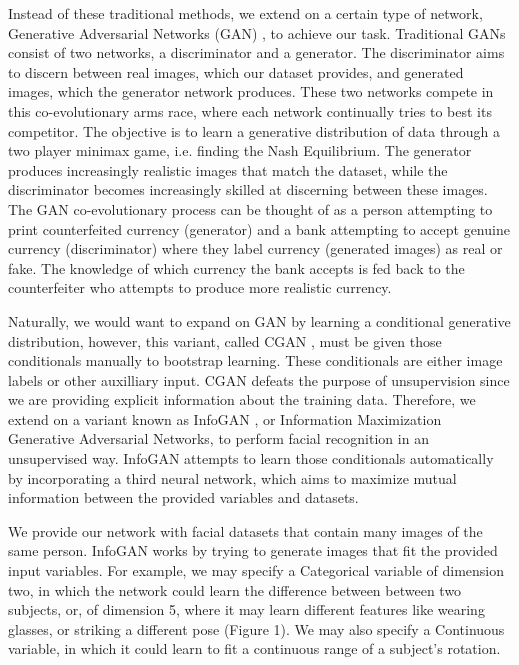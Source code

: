 \documentclass[conference,11pt]{IEEEtran}
\begin{document}
Instead of these traditional methods, we extend on a certain type of network, Generative Adversarial Networks (GAN) \cite{GAN}, to achieve our task.  Traditional GANs consist of two networks, a discriminator and a generator.  The discriminator aims to discern between real images, which our dataset provides, and generated images, which the generator network produces.  These two networks compete in this co-evolutionary arms race, where each network continually tries to best its competitor.  The objective is to learn a generative distribution of data through a two player minimax game, i.e. finding the Nash Equilibrium.  The generator produces increasingly realistic images that match the dataset, while the discriminator becomes increasingly skilled at discerning between these images.  The GAN co-evolutionary process can be thought of as a person attempting to print counterfeited currency (generator) and a bank attempting to accept genuine currency (discriminator) where they label currency (generated images) as real or fake. The knowledge of which currency the bank accepts is fed back to the counterfeiter who attempts to produce more realistic currency.

Naturally, we would want to expand on GAN by learning a conditional generative distribution, however, this variant, called CGAN \cite{CGAN}, must be given those conditionals manually to bootstrap learning.  These conditionals are either image labels or other auxilliary input.  CGAN defeats the purpose of unsupervision since we are providing explicit information about the training data.  Therefore, we extend on a variant known as InfoGAN \cite{infoGAN}, or Information Maximization Generative Adversarial Networks, to perform facial recognition in an unsupervised way.  InfoGAN attempts to learn those conditionals automatically by incorporating a third neural network, which aims to maximize mutual information between the provided variables and datasets.

We provide our network with facial datasets that contain many images of the same person.  InfoGAN works by trying to generate images that fit the provided input variables.  For example, we may specify a Categorical variable of dimension two, in which the network could learn the difference between between two subjects, or, of dimension 5, where it may learn different features like wearing glasses, or striking a different pose (Figure 1).  We may also specify a Continuous variable, in which it could learn to fit a continuous range of a subject's rotation.
\end{document}
